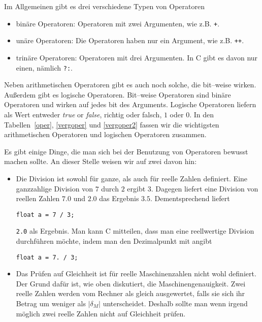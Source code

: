Im Allgemeinen gibt es drei verschiedene Typen von Operatoren
\begin{itemize}
\item binäre Operatoren: Operatoren mit zwei Argumenten, wie z.B. \verb|+|.
\item unäre Operatoren: Die Operatoren haben nur ein Argument, wie z.B. \verb|++|.
\item trinäre Operatoren: Operatoren mit drei Argumenten. In C gibt es davon nur einen, nämlich \verb|?:|.
\end{itemize} 
Neben arithmetischen Operatoren gibt es auch noch solche, die bit--weise wirken. 
Außerdem gibt es logische Operatoren.
Bit--weise Operatoren sind binäre Operatoren und wirken auf jedes bit des Arguments.
Logische Operatoren liefern als Wert entweder \emph{true} or \emph{false}, richtig oder falsch, $1$ oder $0$.
In den Tabellen~\ref{oper}, \ref{vergoper} und \ref{vergoper2} fassen wir die wichtigsten arithmetischen Operatoren und logischen Operatoren zusammen.

Es gibt einige Dinge, die man sich bei der Benutzung von Operatoren bewusst machen sollte.
An dieser Stelle weisen wir auf zwei davon hin:
\begin{itemize}
\item Die Division ist sowohl für ganze, als auch für reelle Zahlen definiert. 
  Eine ganzzahlige Division von $7$ durch $2$ ergibt $3$.
  Dagegen liefert eine Division von reellen Zahlen $7.0$ und $2.0$ das Ergebnis $3.5$.
  Dementsprechend liefert
\begin{lstlisting}
float a = 7 / 3;
\end{lstlisting}
  \verb|2.0| als Ergebnis. 
  Man kann C mitteilen, dass man eine reellwertige Division durchführen möchte, indem man den Dezimalpunkt mit angibt
\begin{lstlisting}
float a = 7. / 3;
\end{lstlisting}
  
\item Das Prüfen auf Gleichheit ist für reelle Maschinenzahlen nicht wohl definiert.
  Der Grund dafür ist, wie oben diskutiert, die Maschinengenauigkeit.
  Zwei reelle Zahlen werden vom Rechner als gleich ausgewertet, falls sie sich ihr Betrag um weniger als $|\delta_M|$ unterscheidet. 
  Deshalb sollte man wenn irgend möglich zwei reelle Zahlen nicht auf Gleichheit prüfen.

\end{itemize}


